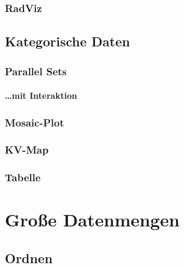             \subsubsection{RadViz} %

        \subsection{Kategorische Daten} %

            \subsubsection{Parallel Sets} %

                \paragraph{\dots mit Interaktion} %

            \subsubsection{Mosaic-Plot} %

            \subsubsection{KV-Map} %

            \subsubsection{Tabelle} %

    \section{Große Datenmengen} %

        \subsection{Ordnen} %


